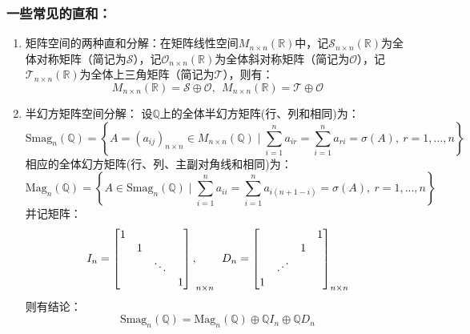 \documentclass[zihao=5,UTF8]{report}
\theoremstyle{mystyle} %
\begin{document}
\subsubsection{一些常见的直和：}
\begin{enumerate}
    \item 矩阵空间的两种直和分解：在矩阵线性空间$M_{n\times n}(\mathbb{R})$中，记$\mathcal{S} _{n\times n}(\mathbb{R})$为全体对称矩阵（简记为$\mathcal{S}$），记$\mathcal{O}_{n\times n}(\mathbb{R})$为全体斜对称矩阵（简记为$\mathcal{O}$），记$\mathcal{T}_{n\times n}(\mathbb{R})$为全体上三角矩阵（简记为$\mathcal{T}$），则有：
    \begin{equation*}
        M_{n\times n}(\mathbb{R}) =\mathcal{S}\oplus  \mathcal{O},\ \ M_{n\times n}(\mathbb{R}) =\mathcal{T}\oplus  \mathcal{O}
    \end{equation*}
    \item 半幻方矩阵空间分解：
    设$\mathbb{Q}$上的全体半幻方矩阵(行、列和相同)为：\begin{equation*}
        \text{Smag}_n(\mathbb{Q}) = \left\{A = (a_{ij})_{n\times n} \in M_{n\times n}(\mathbb{Q}) \mid \sum_{i = 1}^{n}a_{ir} = \sum_{i=1}^{n}a_{ri} = \sigma(A),\ r = 1,...,n\right\}
    \end{equation*}
    相应的全体幻方矩阵(行、列、主副对角线和相同)为：
    \begin{equation*}
        \text{Mag}_n(\mathbb{Q}) = \left\{A \in \text{Smag}_n(\mathbb{Q}) \mid \sum_{i=1}^{n}a_{ii}=  \sum_{i = 1}^{n}a_{i(n+1-i)} = \sigma(A),\ r = 1,...,n\right\}
    \end{equation*}
并记矩阵：
\begin{equation*}
    I_n = 
    {\begin{bmatrix}  
        1 &  &  &  \\  
         & 1 &  &  \\  
         &  & \ddots & \\  
         &  &  & 1 
    \end{bmatrix},}_{n\times n}\ \ 
    D_n = 
    \begin{bmatrix}  
        &&&1\\
        &&1&\\
        &\reflectbox{$\ddots$} &&\\
        1&&&
    \end{bmatrix}_{n\times n}
\end{equation*}
则有结论：
\begin{equation*}
    \text{Smag}_n(\mathbb{Q}) = \text{Mag}_n(\mathbb{Q}) \oplus \mathbb{Q}I_n \oplus  \mathbb{Q}D_n
\end{equation*}


\end{enumerate}
\end{document}

